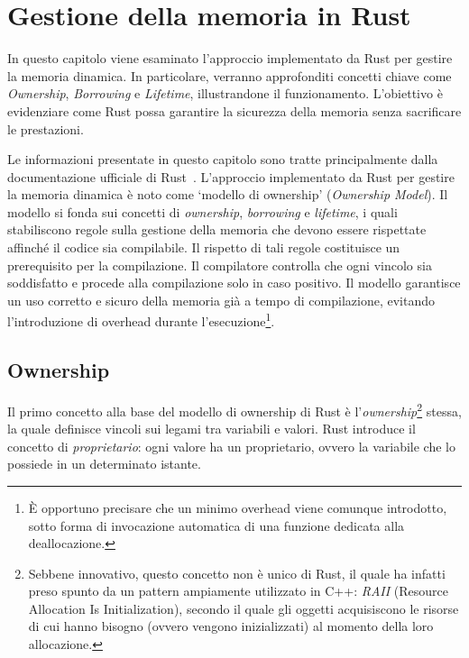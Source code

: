 
\chapter{Gestione della memoria in Rust}\label{cap:03}

In questo capitolo viene esaminato l'approccio implementato da Rust per gestire la memoria dinamica. In particolare, verranno approfonditi concetti chiave come \textit{Ownership}, \textit{Borrowing} e \textit{Lifetime}, illustrandone il funzionamento. L'obiettivo è evidenziare come Rust possa garantire la sicurezza della memoria senza sacrificare le prestazioni.

Le informazioni presentate in questo capitolo sono tratte principalmente dalla documentazione ufficiale di Rust~\cite{rust-book}. \hfill
\vspace{15pt}
\noindent L'approccio implementato da Rust per gestire la memoria dinamica è noto come `modello di ownership' (\textit{Ownership Model}). Il modello si fonda sui concetti di \textit{ownership}, \textit{borrowing} e \textit{lifetime}, i quali stabiliscono regole sulla gestione della memoria che devono essere rispettate affinché il codice sia compilabile. Il rispetto di tali regole costituisce un prerequisito per la compilazione. Il compilatore controlla che ogni vincolo sia soddisfatto e procede alla compilazione solo in caso positivo. Il modello garantisce un uso corretto e sicuro della memoria già a tempo di compilazione, evitando l'introduzione di overhead durante l'esecuzione\footnote{È opportuno precisare che un minimo overhead viene comunque introdotto, sotto forma di invocazione  automatica di una funzione dedicata alla deallocazione.}.
\section{Ownership}
Il primo concetto alla base del modello di ownership di Rust è l'\textit{ownership}\footnote{Sebbene innovativo, questo concetto non è unico di Rust, il quale ha infatti preso spunto da un pattern ampiamente utilizzato in C++: \textit{RAII} (Resource Allocation Is Initialization), secondo il quale gli oggetti acquisiscono le risorse di cui hanno bisogno (ovvero vengono inizializzati) al momento della loro allocazione.} stessa, la quale definisce vincoli sui legami tra variabili e valori. Rust introduce il concetto di \textit{proprietario}: ogni valore ha un proprietario, ovvero la variabile che lo possiede in un determinato istante.

